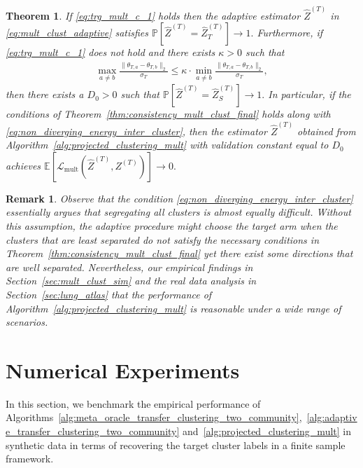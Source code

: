 \documentclass[10pt]{article}
\newtheorem{theorem}{Theorem}
\newtheorem{remark}{Remark}
\newcommand{\wh}{\widehat}
\newcommand{\trg}{T}
\newcommand{\sigmaT}{\sigma_{\trg}}
\newcommand{\Ztar}{Z^{(\trg)}}
\newcommand{\thetamcT}[1]{\theta_{\trg,#1}}
\newcommand{\hatZtar}{\wh{Z}^{(\trg)}}
\begin{document}
\begin{theorem}
\label{thm:consistency_mult_clust_final_adaptive}
If \eqref{eq:trg_mult_c_1} holds
then the adaptive estimator $\hatZtar$ in \eqref{eq:mult_clust_adaptive} satisfies $\mathbb P\left[\hatZtar=\hatZtar_T\right] \to 1.$
Furthermore, if \eqref{eq:trg_mult_c_1} does not hold and there exists $\kappa>0$ such that
\begin{align}
\label{eq:non_diverging_energy_inter_cluster}
\max_{a \neq b}\frac{\|\thetamcT{a}-\thetamcT{b}\|_2}{\sigmaT} \le \kappa\cdot \min_{a \neq b}\frac{\|\thetamcT{a}-\thetamcT{b}\|_2}{\sigmaT} ,
\end{align}
then there exists a $D_0>0$ such that $\mathbb P\left[\hatZtar=\hatZtar_S\right] \to 1.$ In particular, if the conditions of Theorem~\ref{thm:consistency_mult_clust_final} holds along with \eqref{eq:non_diverging_energy_inter_cluster}, then the estimator $\hatZtar$ obtained from Algorithm~\ref{alg:projected_clustering_mult} with validation constant equal to $D_0$ achieves $\mathbb E\left[\mathcal L_{\mathrm{mult}}(\hatZtar,\Ztar)\right]\to 0.$
\end{theorem}

\begin{remark}
Observe that the condition \eqref{eq:non_diverging_energy_inter_cluster} essentially argues that segregating all clusters is almost equally difficult. Without this assumption, the adaptive procedure might choose the target arm when the clusters that are least separated do not satisfy the necessary conditions in Theorem~\ref{thm:consistency_mult_clust_final} yet there exist some directions that are well separated. Nevertheless, our empirical findings in Section~\ref{sec:mult_clust_sim} and the real data analysis in Section~\ref{sec:lung_atlas} that the performance of Algorithm~\ref{alg:projected_clustering_mult} is reasonable under a wide range of scenarios.
\end{remark}




\section{Numerical Experiments}
\label{sec:numerical_methods}
In this section, we benchmark the empirical performance of Algorithms~\ref{alg:meta_oracle_transfer_clustering_two_community},~\ref{alg:adaptive_transfer_clustering_two_community} and~\ref{alg:projected_clustering_mult} in synthetic data in terms of recovering the target cluster labels in a finite sample framework.
\end{document}
